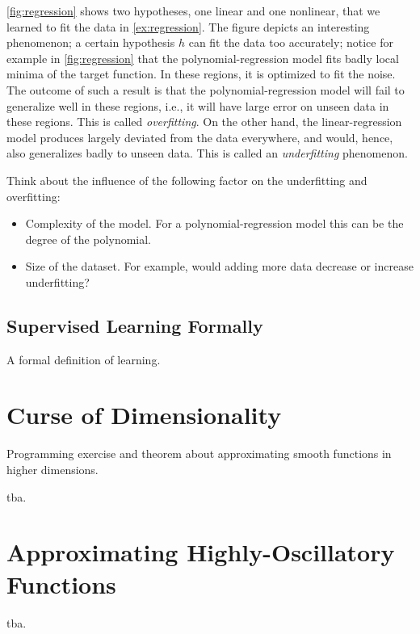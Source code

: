 \autoref{fig:regression} shows two hypotheses, one linear and one nonlinear, that we learned to fit the data in
\autoref{ex:regression}. The figure depicts an interesting phenomenon; a certain
hypothesis $h$ can fit the data too accurately; notice for example in
\autoref{fig:regression} that the polynomial-regression model fits badly local
minima of the target function. In these regions, it is optimized to fit the
noise. The outcome of such a result is that the polynomial-regression model will
fail to generalize well in these regions, i.e., it will have large error on
unseen data in these regions. This is called \emph{overfitting}.
On the other hand, the linear-regression model produces largely deviated from
the data everywhere, and would, hence, also generalizes badly to unseen data.
This is called an \emph{underfitting} phenomenon. 

Think about the influence of the following factor on the underfitting and
overfitting:
\begin{itemize}
    \item Complexity of the model. For a polynomial-regression model this can be
    the degree of the polynomial. 
    \item Size of the dataset. For example, would adding more data decrease or
    increase underfitting?
\end{itemize}

\subsection{Supervised Learning Formally}
A formal definition of learning.

\section{Curse of Dimensionality}
Programming exercise and theorem about approximating smooth functions in higher
dimensions. 
\begin{boxedexample}[Classification] \complementary{\theexample}
    \label{ex:CoD}
tba.
\end{boxedexample}

\section{Approximating Highly-Oscillatory Functions}
\begin{boxedexample}[Classification] \complementary{\theexample}
    \label{ex:oscillatory}
    tba.
\end{boxedexample}

